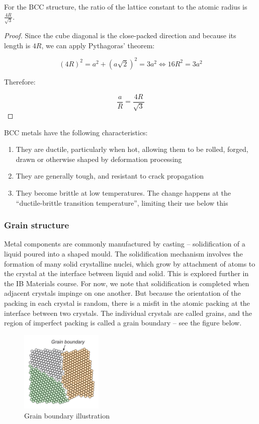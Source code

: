 \documentclass{article}
\begin{document}
\begin{proposition}
    For the BCC structure, the ratio of the lattice constant to the atomic radius is $\frac{4R}{\sqrt{3}}$. 
\end{proposition}

\begin{proof}
    Since the cube diagonal is the close-packed direction and because its length is $4R$, we can apply Pythagoras' theorem:

    \[ (4R)^2 = a^2 + (a\sqrt{2})^2 = 3a^2 \iff 16R^2 = 3a^2 \]

    Therefore:

    \[ \frac{a}{R} = \frac{4R}{\sqrt{3}} \]
\end{proof}

BCC metals have the following characteristics:

\begin{enumerate}
    \item They are ductile, particularly when hot, allowing them to be rolled, forged, drawn or otherwise shaped by deformation processing
    \item They are generally tough, and resistant to crack propagation
    \item They become brittle at low temperatures. The change happens at the “ductile-brittle transition temperature”, limiting their use below this
\end{enumerate}

\subsubsection{Grain structure}

Metal components are commonly manufactured by casting – solidification of a liquid poured into a shaped mould. The solidification mechanism involves the formation of many solid crystalline nuclei, which grow by attachment of atoms to the crystal at the interface between liquid and solid. This is explored further in the IB Materials course. For now, we note that solidification is completed when adjacent crystals impinge on one another. But because the orientation of the packing in each crystal is random, there is a misfit in the atomic packing at the interface between two crystals. The individual crystals are called grains, and the region of imperfect packing is called a grain boundary – see the figure below.

\begin{figure}[h]
    \centering
    \includegraphics[width = 0.35\textwidth]{images/mat7.png}
    \caption{Grain boundary illustration}
    \label{fig:enter-label}
\end{figure}
\end{document}
